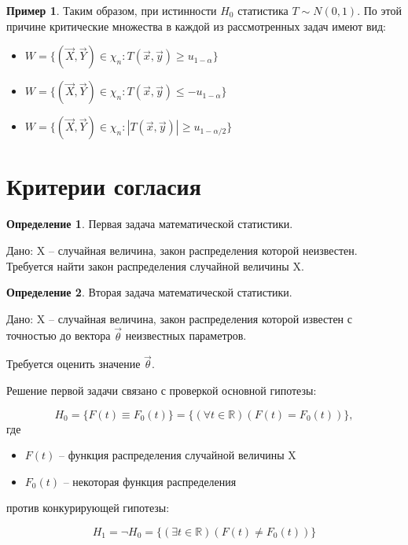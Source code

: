 \documentclass[a4paper, 12pt]{article}
\theoremstyle{definition}
\newtheorem{definition}{Определение}[section]
\theoremstyle{leads}
\theoremstyle{example}
\newtheorem{example}{Пример}
\theoremstyle{remark}
\begin{document}
\begin{example}
 Таким образом, при истинности $H_0$  статистика $T \sim N(0,1)$. По этой причине критические множества в каждой из рассмотренных задач имеют вид:
 \begin{itemize}
 	\item $W = \{(\vec{X}, \vec{Y}) \in \chi_n : T(\vec{x}, \vec{y}) \geq u_{1 - \alpha}\}$
 	\item $W = \{(\vec{X}, \vec{Y}) \in \chi_n : T(\vec{x}, \vec{y}) \leq - u_{1 - \alpha}\}$
 	\item $W = \{(\vec{X}, \vec{Y}) \in \chi_n: |T(\vec{x}, \vec{y})| \geq u_{1 - \alpha/2}\}$
 \end{itemize}
\end{example}

\section{Критерии согласия}
\begin{definition}
	Первая задача математической статистики.
	
	Дано: X -- случайная величина, закон распределения которой неизвестен. Требуется найти закон распределения случайной величины X.
\end{definition}

\begin{definition}
	Вторая задача математической статистики.
	
	Дано: X -- случайная величина, закон распределения которой известен с точностью до вектора $\vec{\theta}$ неизвестных параметров.
	
	Требуется оценить значение $\vec{\theta}$.
\end{definition}

Решение первой задачи связано с проверкой основной гипотезы:

\begin{equation*}
	H_0 = \{F(t) \equiv F_0(t)\} = \{(\forall t \in \mathbb{R})(F(t) = F_0(t))\},
\end{equation*}
где 
\begin{itemize}
	\item $F(t)$ -- функция распределения случайной величины X
	\item $F_0(t)$ -- некоторая функция распределения
\end{itemize}

против конкурирующей гипотезы:

\begin{equation*}
	H_1 = \neg H_0 = \{(\exists t \in \mathbb{R}) (F(t) \neq F_0(t))\}
\end{equation*}
\end{document}
